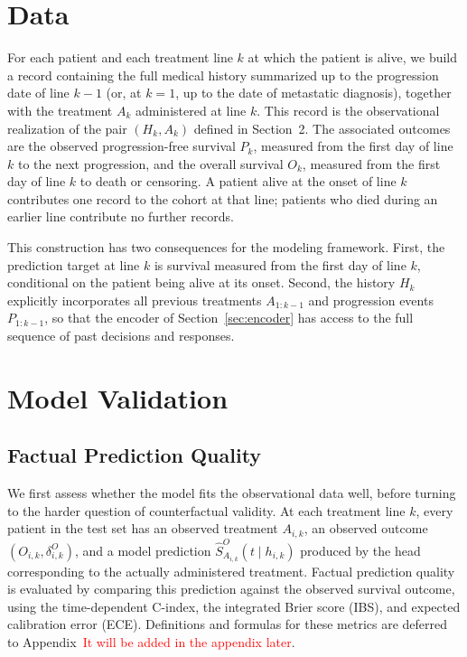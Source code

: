 \documentclass[a4paper,10pt]{article}
\begin{document}
\section{Data}

For each patient and each treatment line $k$ at which the patient is alive, we build a record containing the full medical history summarized up to the progression date of line $k-1$ (or, at $k=1$, up to the date of metastatic diagnosis), together with the treatment $A_k$ administered at line $k$. This record is the observational realization of the pair $(H_k, A_k)$ defined in Section~2. The associated outcomes are the observed progression-free survival $P_k$, measured from the first day of line $k$ to the next progression, and the overall survival $O_k$, measured from the first day of line $k$ to death or censoring. A patient alive at the onset of line $k$ contributes one record to the cohort at that line; patients who died during an earlier line contribute no further records.

This construction has two consequences for the modeling framework. First, the prediction target at line $k$ is survival measured from the first day of line $k$, conditional on the patient being alive at its onset. Second, the history $H_k$ explicitly incorporates all previous treatments $A_{1:k-1}$ and progression events $P_{1:k-1}$, so that the encoder of Section~\ref{sec:encoder} has access to the full sequence of past decisions and responses.


\section{Model Validation}

\subsection{Factual Prediction Quality}
\label{sec:factual-validation}

We first assess whether the model fits the observational data well, before turning to the harder question of counterfactual validity. At each treatment line $k$, every patient in the test set has an observed treatment $A_{i,k}$, an observed outcome $(O_{i,k}, \delta^O_{i,k})$, and a model prediction $\hat{S}^O_{A_{i,k}}(t \mid h_{i,k})$ produced by the head corresponding to the actually administered treatment. Factual prediction quality is evaluated by comparing this prediction against the observed survival outcome, using the time-dependent C-index, the integrated Brier score (IBS), and expected calibration error (ECE). Definitions and formulas for these metrics are deferred to Appendix~\textcolor{red}{It will be added in the appendix later}.
\end{document}
